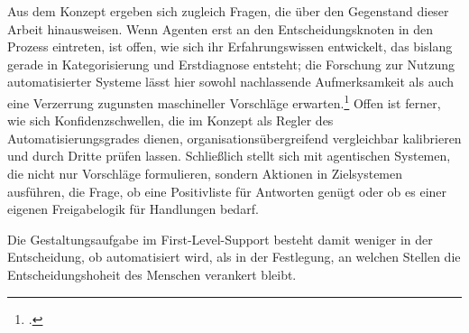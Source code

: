 Aus dem Konzept ergeben sich zugleich Fragen, die \"uber den Gegenstand dieser Arbeit hinausweisen. Wenn Agenten erst an den Entscheidungsknoten in den Prozess eintreten, ist offen, wie sich ihr Erfahrungswissen entwickelt, das bislang gerade in Kategorisierung und Erstdiagnose entsteht; die Forschung zur Nutzung automatisierter Systeme l\"asst hier sowohl nachlassende Aufmerksamkeit als auch eine Verzerrung zugunsten maschineller Vorschl\"age erwarten.\footcite[Vgl.][S.~381]{ParasuramanManzey2010} Offen ist ferner, wie sich Konfidenzschwellen, die im Konzept als Regler des Automatisierungsgrades dienen, organisations\"ubergreifend vergleichbar kalibrieren und durch Dritte pr\"ufen lassen. Schlie{\ss}lich stellt sich mit agentischen Systemen, die nicht nur Vorschl\"age formulieren, sondern Aktionen in Zielsystemen ausf\"uhren, die Frage, ob eine Positivliste f\"ur Antworten gen\"ugt oder ob es einer eigenen Freigabelogik f\"ur Handlungen bedarf.

Die Gestaltungsaufgabe im First-Level-Support besteht damit weniger in der Entscheidung, ob automatisiert wird, als in der Festlegung, an welchen Stellen die Entscheidungshoheit des Menschen verankert bleibt.